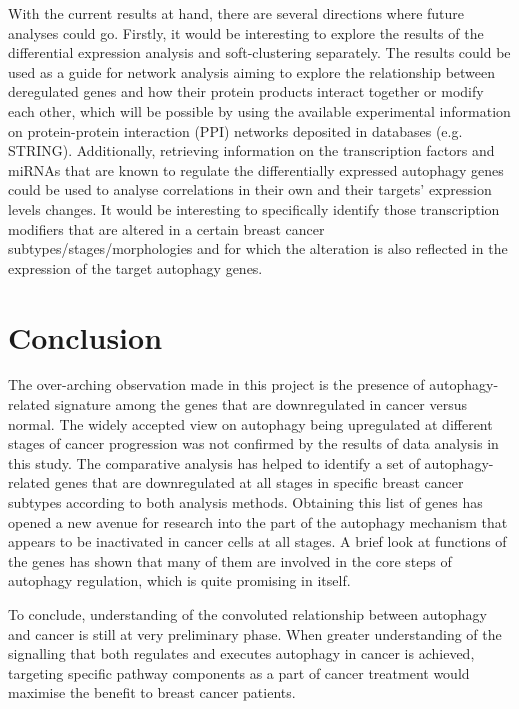 With the current results at hand, there are several directions where future analyses could go. Firstly, it would be interesting to explore the results of the differential expression analysis and soft-clustering separately. The results could be used as a guide for network analysis aiming to explore the relationship between deregulated genes and how their protein products interact together or modify each other, which will be possible by using the available experimental information on protein-protein interaction (PPI) networks deposited in databases (e.g. STRING). Additionally, retrieving information on the transcription factors and miRNAs that are known to regulate the differentially expressed autophagy genes could be used to analyse correlations in their own and their targets’ expression levels changes. It would be interesting to specifically identify those transcription modifiers that are altered in a certain breast cancer subtypes/stages/morphologies and for which the alteration is also reflected in the expression of the target autophagy genes. 

\section{Conclusion}


The over-arching observation made in this project is the presence of autophagy-related signature among the genes that are downregulated in cancer versus normal. The widely accepted view on autophagy being upregulated at different stages of cancer progression was not confirmed by the results of data analysis in this study.
The comparative analysis has helped to identify a set of autophagy-related genes that are downregulated at all stages in specific breast cancer subtypes according to both analysis methods. Obtaining this list of genes has opened a new avenue for research into the part of the autophagy mechanism that appears to be inactivated in cancer cells at all stages. A brief look at functions of the genes has shown that many of them are involved in the core steps of autophagy regulation, which is quite promising in itself. 

To conclude, understanding of the convoluted relationship between autophagy and cancer is still at very preliminary phase. When greater understanding of the signalling that both regulates and executes autophagy in cancer is achieved, targeting specific pathway components as a part of cancer treatment would maximise the benefit to breast cancer patients.






